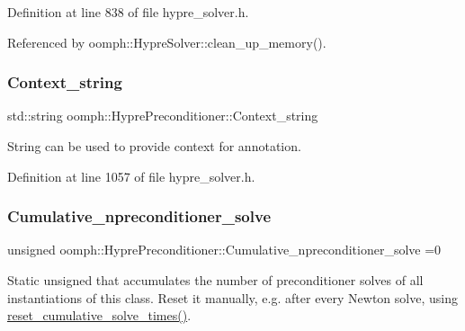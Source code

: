 Definition at line 838 of file hypre\+\_\+solver.\+h.



Referenced by oomph\+::\+Hypre\+Solver\+::clean\+\_\+up\+\_\+memory().

\mbox{\label{classoomph_1_1HyprePreconditioner_a2662d242a5a13b6ce7c4f570e48c2615}} 
\subsubsection{\texorpdfstring{Context\+\_\+string}{Context\_string}}
{\footnotesize\ttfamily std\+::string oomph\+::\+Hypre\+Preconditioner\+::\+Context\+\_\+string\hspace{0.3cm}{\ttfamily [private]}}



String can be used to provide context for annotation. 



Definition at line 1057 of file hypre\+\_\+solver.\+h.

\mbox{\label{classoomph_1_1HyprePreconditioner_ad38447ce80a362510590b770cc501885}} 
\subsubsection{\texorpdfstring{Cumulative\+\_\+npreconditioner\+\_\+solve}{Cumulative\_npreconditioner\_solve}}
{\footnotesize\ttfamily unsigned oomph\+::\+Hypre\+Preconditioner\+::\+Cumulative\+\_\+npreconditioner\+\_\+solve =0\hspace{0.3cm}{\ttfamily [static]}}



Static unsigned that accumulates the number of preconditioner solves of all instantiations of this class. Reset it manually, e.\+g. after every Newton solve, using \hyperlink{classoomph_1_1HyprePreconditioner_a126763a53b2c687bc1b150d0fc64fbb6}{reset\+\_\+cumulative\+\_\+solve\+\_\+times()}. 



